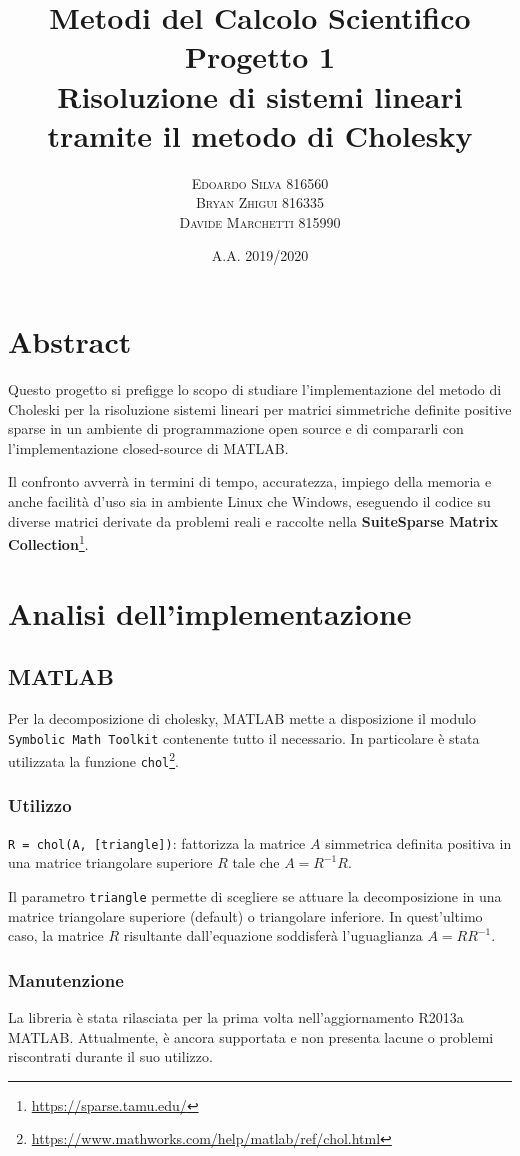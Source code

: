 \documentclass[11pt,italian]{article}
\title{
    Metodi del Calcolo Scientifico \\
    \normalsize Progetto 1 \\
    \normalsize Risoluzione di sistemi lineari tramite il metodo di Cholesky \\
}
\date{\small A.A. 2019/2020}
\author{
    \normalsize
    \textsc{Edoardo Silva} 816560 \\
    \normalsize
    \textsc{Bryan Zhigui} 816335 \\
    \normalsize
    \textsc{Davide Marchetti} 815990
}
\begin{document}
\maketitle

\section*{Abstract}
Questo progetto si prefigge lo scopo di studiare l'implementazione del metodo di Choleski per la risoluzione sistemi lineari per matrici simmetriche definite positive sparse in un ambiente di programmazione open source e di compararli con l'implementazione closed-source di MATLAB.

Il confronto avverrà in termini di tempo, accuratezza, impiego della memoria e anche facilità d'uso sia in ambiente Linux che Windows, eseguendo il codice su diverse matrici derivate da problemi reali e raccolte nella \textbf{SuiteSparse Matrix Collection}\footnote{\url{https://sparse.tamu.edu/}}.

\newpage
\section{Analisi dell'implementazione}

\subsection{MATLAB}
Per la decomposizione di cholesky, MATLAB mette a disposizione il modulo \lstinline{Symbolic Math Toolkit} contenente tutto il necessario. In particolare è stata utilizzata la funzione \lstinline{chol}\footnote{\url{https://www.mathworks.com/help/matlab/ref/chol.html}}.

\subsubsection*{Utilizzo}
\lstinline{R = chol(A, [triangle])}: fattorizza la matrice $A$ simmetrica definita positiva in una matrice triangolare superiore $R$ tale che $A=R^{-1}R$.

Il parametro \lstinline{triangle} permette di scegliere se attuare la decomposizione in una matrice triangolare superiore (default) o triangolare inferiore.
In quest'ultimo caso, la matrice $R$ risultante dall'equazione soddisferà l'uguaglianza $A = RR^{-1}$.

\subsubsection*{Manutenzione}
La libreria è stata rilasciata per la prima volta nell'aggiornamento R2013a MATLAB. Attualmente, è ancora supportata e non presenta lacune o problemi riscontrati durante il suo utilizzo.
\end{document}

